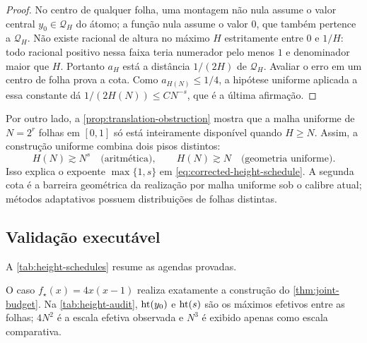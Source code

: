 \begin{proof}
No centro de qualquer folha, uma montagem não nula assume o valor central
$y_0\in\mathcal Q_H$ do átomo; a função nula assume o valor $0$, que também
pertence a $\mathcal Q_H$. Não existe racional de altura no máximo $H$
estritamente entre $0$ e $1/H$: todo racional positivo nessa faixa teria
numerador pelo menos $1$ e denominador maior que $H$. Portanto
$a_H$ está a distância $1/(2H)$ de $\mathcal Q_H$. Avaliar o erro em um
centro de folha prova a cota. Como $a_{H(N)}\le1/4$, a hipótese uniforme
aplicada a essa constante dá
$1/(2H(N))\le CN^{-s}$, que é a última afirmação.
\end{proof}

Por outro lado, a \cref{prop:translation-obstruction} mostra que a malha
uniforme de $N=2^r$ folhas em $[0,1]$ só está inteiramente disponível quando
$H\ge N$. Assim, a construção uniforme combina dois pisos distintos:
\begin{equation}
 H(N)\gtrsim N^s\quad\text{(aritmética)},
 \qquad
 H(N)\gtrsim N\quad\text{(geometria uniforme)}.
 \label{eq:two-height-floors}
\end{equation}
Isso explica o expoente $\max\{1,s\}$ em
\eqref{eq:corrected-height-schedule}. A segunda cota é a barreira geométrica
da realização por malha uniforme sob o calibre atual; métodos adaptativos
possuem distribuições de folhas distintas.

\subsection{Validação executável}

A \cref{tab:height-schedules} resume as agendas provadas.
\begin{table}[t]
 \centering
 \small
 
 \caption{Agendas suficientes. O fator logarítmico pertence à
 somabilidade para $q<\infty$, não à propagação algébrica da inclinação.}
 \label{tab:height-schedules}
\end{table}

O caso $f_\star(x)=4x(x-1)$ realiza exatamente a construção do
\cref{thm:joint-budget}.
Na \cref{tab:height-audit}, $\operatorname{ht}(y_0)$ e $\operatorname{ht}(s)$ são os
máximos efetivos entre as folhas; $4N^2$ é a escala efetiva observada e
$N^3$ é exibido apenas como escala comparativa.
\begin{table}[t]
 \centering
 \small
 
 \caption{Auditoria racional exata da agenda para $f_\star$. Em $N=32$ e
 $128$, recuperam-se respectivamente
 $(\height(y_0),\height(s))=(4096,249)$ e $(65536,1017)$. Os valores
 tabulados são exatos; em
 \texttt{resultados\_espacos\_aproximacao.json}, somente os diagnósticos
 logarítmicos auxiliares são armazenados em ponto flutuante e, por isso, não
 se exige identidade byte a byte desses campos entre plataformas.}
 \label{tab:height-audit}
\end{table}

